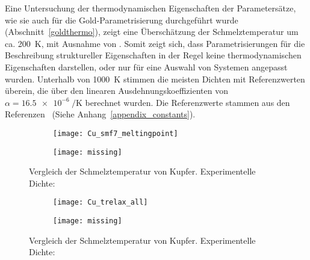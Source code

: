 Eine Untersuchung der thermodynamischen Eigenschaften der Parametersätze, wie sie auch für die Gold-Parametrisierung durchgeführt wurde (Abschnitt~\ref{goldthermo}), zeigt eine Überschätzung der Schmelztemperatur um ca. \SI{200}{\kelvin}, mit Ausnahme von .
Somit zeigt sich, dass Parametrisierungen für die Beschreibung struktureller Eigenschaften in der Regel keine thermodynamischen Eigenschaften darstellen, oder nur für eine Auswahl von Systemen angepasst wurden.
Unterhalb von \SI{1000}{\kelvin} stimmen die meisten Dichten mit Referenzwerten überein, die über den linearen Ausdehnungskoeffizienten von $\alpha = \SI{16.5e-6}{\per\kelvin}$\cite{haynes_crc_2011} berechnet wurden.
Die Referenzwerte stammen aus den Referenzen~\cite{haynes_crc_2011,brillo_density_2006} (Siehe Anhang~\ref{appendix_constants}).


\begin{figure}[H]
  \captionsetup[subfigure]{singlelinecheck=false}
  \def\subfigwidth{7cm}
  \begin{subfigure}[t]{\subfigwidth}
    \texttt{[image: Cu\_smf7\_meltingpoint]}
  \end{subfigure}
  \hfill
  \begin{subfigure}[t]{\subfigwidth}
    \texttt{[image: missing]}
  \end{subfigure}
  \caption[Vergleich der Schmelztemperatur von Kupfer]{
    Vergleich der Schmelztemperatur von Kupfer.
    Experimentelle Dichte:~\cite{brillo_density_2006}
  }
  \label{fig:copperthermo}
\end{figure}

\begin{figure}[H]
  \captionsetup[subfigure]{singlelinecheck=false}
  \def\subfigwidth{7cm}
  \begin{subfigure}[t]{\subfigwidth}
    \texttt{[image: Cu\_trelax\_all]}
  \end{subfigure}
  \hfill
  \begin{subfigure}[t]{\subfigwidth}
    \texttt{[image: missing]}
  \end{subfigure}
  \caption[Vergleich der Schmelztemperatur von Kupfer]{
    Vergleich der Schmelztemperatur von Kupfer.
    Experimentelle Dichte:~\cite{brillo_density_2006}
  }
  \label{fig:copperthermo}
\end{figure}

